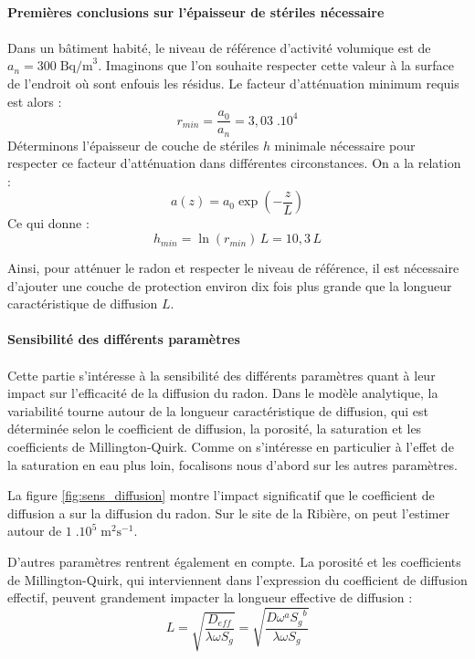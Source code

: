 \documentclass{article}
\begin{document}
\paragraph{Premières conclusions sur l'épaisseur de stériles nécessaire}

\paragraph{} Dans un bâtiment habité, le niveau de référence d’activité volumique est de $a_n=300 \; \text{Bq/m}^3$. Imaginons que l’on souhaite respecter cette valeur à la surface de l’endroit où sont enfouis les résidus. Le facteur d’atténuation minimum requis est alors :
$$
r_{min}=\frac{a_0}{a_n} =3,03 \; .10^4
$$
Déterminons l’épaisseur de couche de stériles $h$ minimale nécessaire pour respecter ce facteur d’atténuation dans différentes circonstances. On a la relation :
$$
a(z)=a_0 \exp(-\frac{z}{L})
$$
Ce qui donne :
$$
h_{min}=\ln(r_{min}) \,L =10,3 \,L 
$$

Ainsi, pour atténuer le radon et respecter le niveau de référence, il est nécessaire d’ajouter une couche de protection environ dix fois plus grande que la longueur caractéristique de diffusion $L$.

\paragraph{Sensibilité des différents paramètres}
\paragraph{} Cette partie s'intéresse à la sensibilité des différents paramètres quant à leur impact sur l'efficacité de la diffusion du radon. Dans le modèle analytique, la variabilité tourne autour de la longueur caractéristique de diffusion, qui est déterminée selon le coefficient de diffusion, la porosité, la saturation et les coefficients de Millington-Quirk. Comme on s'intéresse en particulier à l'effet de la saturation en eau plus loin, focalisons nous d'abord sur les autres paramètres.

La figure \ref{fig:sens_diffusion} montre l'impact significatif que le coefficient de diffusion a sur la diffusion du radon. Sur le site de la Ribière, on peut l'estimer autour de $1 \; .10^5 \; \text{m}^2 \text{s}^{-1}$.

D'autres paramètres rentrent également en compte. La porosité et les coefficients de Millington-Quirk, qui interviennent dans l’expression du coefficient de diffusion effectif, peuvent grandement impacter la longueur effective de diffusion :
$$
L=\sqrt{\frac{D_{eff}}{\lambda \omega S_g }}=\sqrt{\frac{D \omega^a {S_g}^b}{\lambda \omega S_g }}
$$
\end{document}
